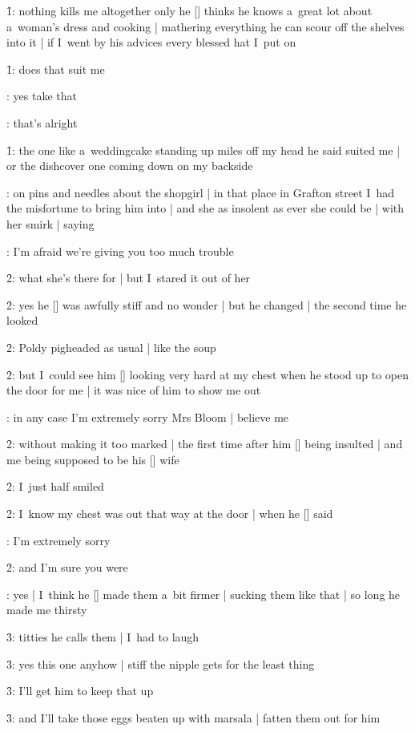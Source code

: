 \f1:
nothing kills me altogether
only he [\bloom] thinks he knows a~great lot about a~woman's dress and cooking |
mathering everything he can scour off the shelves into it |
if I~went by his advices every blessed hat I~put on

\f1:
does that suit me

:
yes take that

:
that's alright

\f1:
the one like a~weddingcake standing up miles off my head he said suited me |
or the dishcover one coming down on my backside

:
on pins and needles about the shopgirl |
in that place in Grafton street I~had the misfortune to bring him into |
and she as insolent as ever she could be |
with her smirk |
saying

:
I'm afraid we're giving you too much trouble

\f2:
what she's there for |
but I~stared it out of her

\f2:
yes he [\cuffe] was awfully stiff and no wonder |
but he changed |
the second time he looked

\f2:
Poldy pigheaded as usual |
like the soup

\f2:
but I~could see him [\cuffe] looking very hard at my chest
when he stood up to open the door for me |
it was nice of him to show me out

:
in any case I'm extremely sorry Mrs Bloom |
believe me

\f2:
without making it too marked |
the first time after him [\cuffe] being insulted |
and me being supposed to be his [\bloom] wife

\f2:
I~just half smiled

\f2:
I~know my chest was out that way at the door |
when he [\cuffe] said

:
I'm extremely sorry

\f2:
and I'm sure you were




:
yes |
I~think he [\boylan] made them a~bit firmer |
sucking them like that |
so long he made me thirsty

\f3:
titties he calls them |
I~had to laugh

\f3:
yes this one anyhow |
stiff the nipple gets for the least thing

\f3:
I'll get him to keep that up

\f3:
and I'll take those eggs beaten up with marsala |
fatten them out for him

